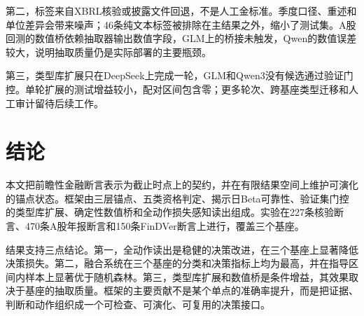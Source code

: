 第二，标签来自XBRL核验或披露文件回退，不是人工金标准。季度口径、重述和单位差异会带来噪声；46条纯文本标签被排除在主结果之外，缩小了测试集。A股回测的数值桥依赖抽取器输出数值字段，GLM上的桥接未触发，Qwen的数值误差较大，说明抽取质量仍是实际部署的主要瓶颈。

第三，类型库扩展只在DeepSeek上完成一轮，GLM和Qwen3没有候选通过验证门控。单轮扩展的测试增益较小，配对区间包含零；更多轮次、跨基座类型迁移和人工审计留待后续工作。

\section{结论}

本文把前瞻性金融断言表示为截止时点上的契约，并在有限结果空间上维护可演化的锚点状态。框架由三层锚点、五类资格判定、揭示日Beta可靠性、验证集门控的类型库扩展、确定性数值桥和全动作损失感知读出组成。实验在227条核验断言、470条A股年报断言和150条FinDVer断言上进行，覆盖三个基座。

结果支持三点结论。第一，全动作读出是稳健的决策改进，在三个基座上显著降低决策损失。第二，融合系统在三个基座的分类和决策指标上均为最高，并在指导区间内样本上显著优于随机森林。第三，类型库扩展和数值桥是条件增益，其效果取决于基座的抽取质量。框架的主要贡献不是某个单点的准确率提升，而是把证据、判断和动作组织成一个可检查、可演化、可复用的决策接口。

\clearpage
{}
{}
{\setlength{\baselineskip}{16pt}}
